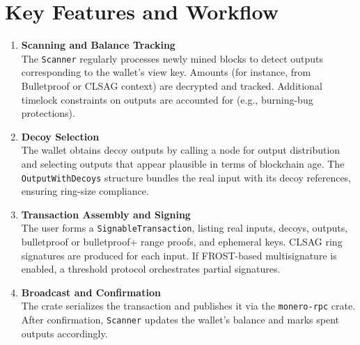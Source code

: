 \documentclass[12pt,a4paper]{article}
\begin{document}

\section{Key Features and Workflow}
\label{sec:key-features-workflow}

\begin{enumerate}
  \item \textbf{Scanning and Balance Tracking}\\
  The \texttt{Scanner} regularly processes newly mined blocks to detect outputs corresponding
  to the wallet’s view key. Amounts (for instance, from Bulletproof or CLSAG context) are 
  decrypted and tracked. Additional timelock constraints on outputs are accounted for 
  (e.g., burning-bug protections).

  \item \textbf{Decoy Selection}\\
  The wallet obtains decoy outputs by calling a node for output distribution and selecting 
  outputs that appear plausible in terms of blockchain age. The \texttt{OutputWithDecoys} 
  structure bundles the real input with its decoy references, ensuring ring-size compliance.

  \item \textbf{Transaction Assembly and Signing}\\
  The user forms a \texttt{SignableTransaction}, listing real inputs, decoys, outputs, 
  bulletproof or bulletproof+ range proofs, and ephemeral keys. 
  CLSAG ring signatures are produced for each input. 
  If FROST-based multisignature is enabled, a threshold protocol orchestrates partial signatures.

  \item \textbf{Broadcast and Confirmation}\\
  The crate serializes the transaction and publishes it via the \texttt{monero-rpc} crate. 
  After confirmation, \texttt{Scanner} updates the wallet's balance and marks spent outputs 
  accordingly.
\end{enumerate}
\end{document}
